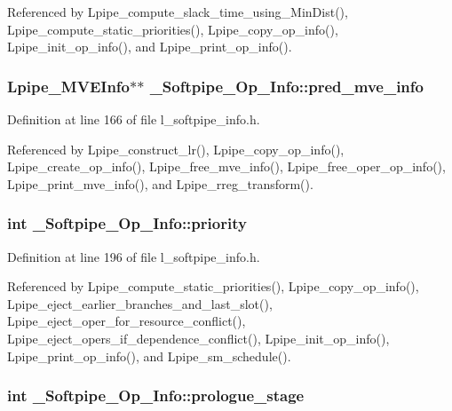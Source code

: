Referenced by Lpipe\_\-compute\_\-slack\_\-time\_\-using\_\-Min\-Dist(), Lpipe\_\-compute\_\-static\_\-priorities(), Lpipe\_\-copy\_\-op\_\-info(), Lpipe\_\-init\_\-op\_\-info(), and Lpipe\_\-print\_\-op\_\-info().
\subsubsection{\setlength{\rightskip}{0pt plus 5cm}\bf{Lpipe\_\-MVEInfo}$\ast$$\ast$ \bf{\_\-Softpipe\_\-Op\_\-Info::pred\_\-mve\_\-info}}\label{struct__Softpipe__Op__Info_b94a61078ba4150ddc32e6ebb519ab2c}




Definition at line 166 of file l\_\-softpipe\_\-info.h.

Referenced by Lpipe\_\-construct\_\-lr(), Lpipe\_\-copy\_\-op\_\-info(), Lpipe\_\-create\_\-op\_\-info(), Lpipe\_\-free\_\-mve\_\-info(), Lpipe\_\-free\_\-oper\_\-op\_\-info(), Lpipe\_\-print\_\-mve\_\-info(), and Lpipe\_\-rreg\_\-transform().
\subsubsection{\setlength{\rightskip}{0pt plus 5cm}int \bf{\_\-Softpipe\_\-Op\_\-Info::priority}}\label{struct__Softpipe__Op__Info_894628085295a2ff6742a3c68cf73761}




Definition at line 196 of file l\_\-softpipe\_\-info.h.

Referenced by Lpipe\_\-compute\_\-static\_\-priorities(), Lpipe\_\-copy\_\-op\_\-info(), Lpipe\_\-eject\_\-earlier\_\-branches\_\-and\_\-last\_\-slot(), Lpipe\_\-eject\_\-oper\_\-for\_\-resource\_\-conflict(), Lpipe\_\-eject\_\-opers\_\-if\_\-dependence\_\-conflict(), Lpipe\_\-init\_\-op\_\-info(), Lpipe\_\-print\_\-op\_\-info(), and Lpipe\_\-sm\_\-schedule().
\subsubsection{\setlength{\rightskip}{0pt plus 5cm}int \bf{\_\-Softpipe\_\-Op\_\-Info::prologue\_\-stage}}\label{struct__Softpipe__Op__Info_368464d3331a9a8060fec13d357b0312}




